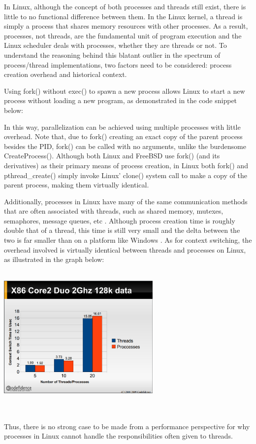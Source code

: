 \documentclass[onecolumn, draftclsnofoot,10pt, compsoc]{IEEEtran}
\begin{document}
In Linux, although the concept of both processes and threads still exist, there is little to no functional difference between them. In the Linux kernel, a thread is simply a process that shares memory resources with other processes. As a result, processes, not threads, are the fundamental unit of program execution and the Linux scheduler deals with processes, whether they are threads or not. To understand the reasoning behind this blatant outlier in the spectrum of process/thread implementations, two factors need to be considered: process creation overhead and historical context. 

Using fork() without exec() to spawn a new process allows Linux to start a new process without loading a new program, as demonstrated in the code snippet below:


In this way, parallelization can be achieved using multiple processes with little overhead. Note that, due to fork() creating an exact copy of the parent process besides the PID, fork() can be called with no arguments, unlike the burdensome CreateProcess(). Although both Linux and FreeBSD use fork() (and its derivatives) as their primary means of process creation, in Linux both fork() and pthread\_create() simply invoke Linux' clone() system call to make a copy of the parent process, making them virtually identical.

Additionally, processes in Linux have many of the same communication methods that are often associated with threads, such as shared memory, mutexes, semaphores, message queues, etc \cite{LinuxSlides}. Although process creation time is roughly double that of a thread, this time is still very small and the delta between the two is far smaller than on a platform like Windows \cite{LinuxSlides}. As for context switching, the overhead involved is virtually identical between threads and processes on Linux, as illustrated in the graph below:\\ \\
\begin{minipage}{\linewidth}
\begin{center}
\includegraphics[width=0.6\textwidth]{context_switch_overhead.eps}
\end{center}
\end{minipage}
\\ \\Thus, there is no strong case to be made from a performance perspective for why processes in Linux cannot handle the responsibilities often given to threads.
\end{document}
